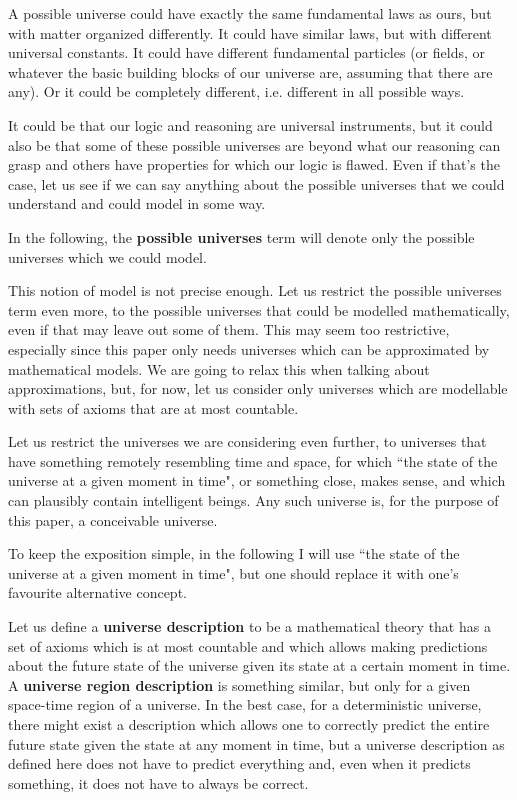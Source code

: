 \documentclass[a4paper
,draft
]{article}
\newcommand{\definitie}[1]{\textbf{#1}}
\newcommand{\ghilimele}[1]{``#1"}
\begin{document}
A possible universe
could have exactly the same fundamental laws as ours, but with matter
organized differently.
It could have similar laws, but with different universal constants.
It could have different fundamental particles (or fields, or whatever the basic
building blocks of our universe are, assuming that there are any).
Or it could be completely different, i.e. different in all possible ways.

It could be that our logic and reasoning are universal instruments,
but it could also be that some of these possible universes are
beyond what our reasoning can grasp and others have properties
for which our logic is flawed.
Even if that's the case, let us see if we can say anything about
the possible universes that we could understand and could model in some way.

In the following, the \definitie{possible universes} term will denote
only the possible universes which we could model.

This notion of model is not precise enough.
Let us restrict the possible universes term even more,
to the possible universes that could be modelled mathematically,
even if that may leave out some of them.
This may seem too restrictive,
especially since this paper only needs universes which can be approximated
by mathematical models.
We are going to relax this when talking about approximations, but, for now,
let us consider only universes
which are modellable with sets of axioms that are at most countable.

Let us restrict the universes we are considering even further, to universes that
have something remotely resembling time and space, for which
\ghilimele{the state of the universe at a given moment in time}, or something
close, makes sense, and which can plausibly contain intelligent beings.
Any such universe is, for the purpose of this paper, a conceivable universe.

To keep the exposition simple, in the following I will use
\ghilimele{the state of the universe at a given moment in time},
but one should replace it with one's favourite alternative concept.

Let us define a \definitie{universe description} to be a mathematical
theory that has
a set of axioms which is at most countable and which allows making
predictions about the future state of the universe given its state
at a certain moment in time. A \definitie{universe region description}
is something similar, but only for a given space-time region of a universe.
In the best case, for a deterministic universe, there might exist
a description which allows one to correctly predict the entire future state
given the state at any moment in time, but a universe description
as defined here does not have to predict everything and,
even when it predicts something, it does not have to always be correct.
\end{document}
